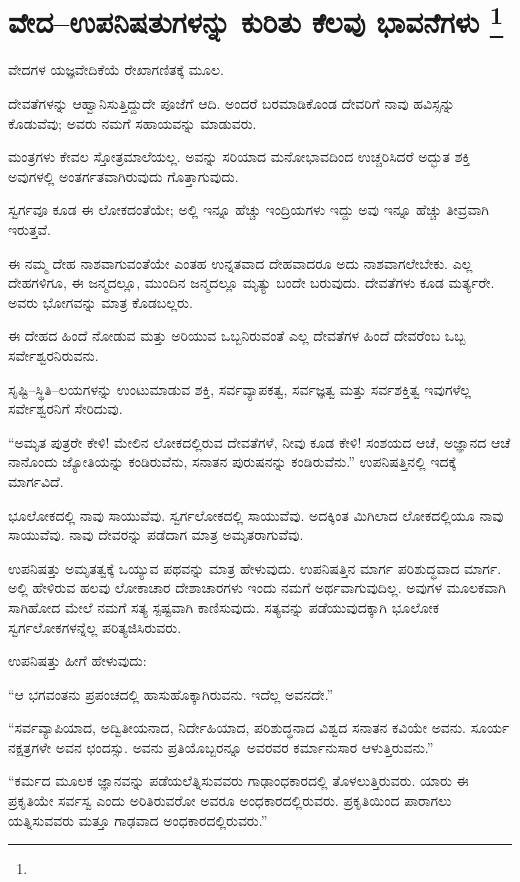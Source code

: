 
\chapter[ವೇದ–ಉಪನಿಷತುಗಳನ್ನು ಕುರಿತು ಕೆಲವು ಭಾವನೆಗಳು ]{ವೇದ–ಉಪನಿಷತುಗಳನ್ನು ಕುರಿತು ಕೆಲವು ಭಾವನೆಗಳು \protect\footnote{}}

ವೇದಗಳ ಯಜ್ಞವೇದಿಕೆಯೆ ರೇಖಾಗಣಿತಕ್ಕೆ  ಮೂಲ.

ದೇವತೆಗಳನ್ನು ಆಹ್ವಾನಿಸುತ್ತಿದ್ದುದೇ ಪೂಜೆಗೆ ಆದಿ. ಅಂದರೆ ಬರಮಾಡಿಕೊಂಡ ದೇವರಿಗೆ ನಾವು ಹವಿಸ್ಸನ್ನು ಕೊಡುವೆವು; ಅವರು ನಮಗೆ ಸಹಾಯವನ್ನು ಮಾಡುವರು.

ಮಂತ್ರಗಳು ಕೇವಲ ಸ್ತೋತ್ರಮಾಲೆಯಲ್ಲ. ಅವನ್ನು ಸರಿಯಾದ ಮನೋಭಾವದಿಂದ ಉಚ್ಚರಿಸಿದರೆ ಅದ್ಭುತ ಶಕ್ತಿ ಅವುಗಳಲ್ಲಿ ಅಂತರ್ಗತವಾಗಿರುವುದು ಗೊತ್ತಾಗುವುದು.

ಸ್ವರ್ಗವೂ ಕೂಡ ಈ ಲೋಕದಂತೆಯೇ; ಅಲ್ಲಿ ಇನ್ನೂ ಹೆಚ್ಚು ಇಂದ್ರಿಯಗಳು ಇದ್ದು ಅವು ಇನ್ನೂ ಹೆಚ್ಚು ತೀವ್ರವಾಗಿ ಇರುತ್ತವೆ.

ಈ ನಮ್ಮ ದೇಹ ನಾಶವಾಗುವಂತೆಯೇ ಎಂತಹ ಉನ್ನತವಾದ ದೇಹವಾದರೂ ಅದು ನಾಶವಾಗಲೇಬೇಕು. ಎಲ್ಲ ದೇಹಗಳಿಗೂ, ಈ ಜನ್ಮದಲ್ಲೂ, ಮುಂದಿನ ಜನ್ಮದಲ್ಲೂ ಮೃತ್ಯು ಬಂದೇ ಬರುವುದು. ದೇವತೆಗಳು ಕೂಡ ಮರ್ತ್ಯರೇ. ಅವರು ಭೋಗವನ್ನು ಮಾತ್ರ ಕೊಡಬಲ್ಲರು.

ಈ ದೇಹದ ಹಿಂದೆ ನೋಡುವ ಮತ್ತು ಅರಿಯುವ ಒಬ್ಬನಿರುವಂತೆ ಎಲ್ಲ ದೇವತೆಗಳ ಹಿಂದೆ ದೇವರೆಂಬ ಒಬ್ಬ ಸರ್ವೇಶ್ವರನಿರುವನು.

ಸೃಷ್ಟಿ–ಸ್ಥಿತಿ–ಲಯಗಳನ್ನು ಉಂಟುಮಾಡುವ ಶಕ್ತಿ, ಸರ್ವವ್ಯಾಪಕತ್ವ, ಸರ್ವಜ್ಞತ್ವ ಮತ್ತು ಸರ್ವಶಕ್ತಿತ್ವ ಇವುಗಳೆಲ್ಲ ಸರ್ವೇಶ್ವರನಿಗೆ ಸೇರಿದುವು.

“ಅಮೃತ ಪುತ್ರರೇ ಕೇಳಿ! ಮೇಲಿನ ಲೋಕದಲ್ಲಿರುವ ದೇವತೆಗಳೆ, ನೀವು ಕೂಡ ಕೇಳಿ! ಸಂಶಯದ ಆಚೆ, ಅಜ್ಞಾನದ ಆಚೆ ನಾನೊಂದು ಜ್ಯೋತಿಯನ್ನು ಕಂಡಿರುವೆನು, ಸನಾತನ ಪುರುಷನನ್ನು ಕಂಡಿರುವೆನು.” ಉಪನಿಷತ್ತಿನಲ್ಲಿ ಇದಕ್ಕೆ ಮಾರ್ಗವಿದೆ.

ಭೂಲೋಕದಲ್ಲಿ ನಾವು ಸಾಯುವೆವು. ಸ್ವರ್ಗಲೋಕದಲ್ಲಿ ಸಾಯುವೆವು. ಅದಕ್ಕಿಂತ ಮಿಗಿಲಾದ ಲೋಕದಲ್ಲಿಯೂ ನಾವು ಸಾಯುವೆವು. ನಾವು ದೇವರನ್ನು ಪಡೆದಾಗ ಮಾತ್ರ ಅಮೃತರಾಗುವೆವು.

ಉಪನಿಷತ್ತು ಅಮೃತತ್ವಕ್ಕೆ ಒಯ್ಯುವ ಪಥವನ್ನು ಮಾತ್ರ ಹೇಳುವುದು. ಉಪನಿಷತ್ತಿನ ಮಾರ್ಗ ಪರಿಶುದ್ಧವಾದ ಮಾರ್ಗ. ಅಲ್ಲಿ ಹೇಳಿರುವ ಹಲವು ಲೋಕಾಚಾರ ದೇಶಾಚಾರಗಳು ಇಂದು ನಮಗೆ ಅರ್ಥವಾಗುವುದಿಲ್ಲ. ಅವುಗಳ ಮೂಲಕವಾಗಿ ಸಾಗಿಹೋದ ಮೇಲೆ ನಮಗೆ ಸತ್ಯ ಸ್ಪಷ್ಟವಾಗಿ ಕಾಣಿಸುವುದು. ಸತ್ಯವನ್ನು ಪಡೆಯುವುದಕ್ಕಾಗಿ ಭೂಲೋಕ ಸ್ವರ್ಗಲೋಕಗಳನ್ನೆಲ್ಲ ಪರಿತ್ಯಜಿಸಿರುವರು.

ಉಪನಿಷತ್ತು ಹೀಗೆ ಹೇಳುವುದು:

“ಆ ಭಗವಂತನು ಪ್ರಪಂಚದಲ್ಲಿ ಹಾಸುಹೊಕ್ಕಾಗಿರುವನು. ಇದೆಲ್ಲ ಅವನದೇ.”

“ಸರ್ವವ್ಯಾಪಿಯಾದ, ಅದ್ವಿತೀಯನಾದ, ನಿರ್ದೇಹಿಯಾದ, ಪರಿಶುದ್ಧನಾದ ವಿಶ್ವದ ಸನಾತನ ಕವಿಯೇ ಅವನು. ಸೂರ್ಯ ನಕ್ಷತ್ರಗಳೇ ಅವನ ಛಂದಸ್ಸು. ಅವನು ಪ್ರತಿಯೊಬ್ಬರನ್ನೂ ಅವರವರ ಕರ್ಮಾನುಸಾರ ಆಳುತ್ತಿರುವನು.”

“ಕರ್ಮದ ಮೂಲಕ ಜ್ಞಾನವನ್ನು ಪಡೆಯಲೆತ್ನಿಸುವವರು ಗಾಢಾಂಧಕಾರದಲ್ಲಿ ತೊಳಲುತ್ತಿರುವರು. ಯಾರು ಈ ಪ್ರಕೃತಿಯೇ ಸರ್ವಸ್ವ ಎಂದು ಅರಿತಿರುವರೋ ಅವರೂ ಅಂಧಕಾರದಲ್ಲಿರುವರು. ಪ್ರಕೃತಿಯಿಂದ ಪಾರಾಗಲು ಯತ್ನಿಸುವವರು ಮತ್ತೂ ಗಾಢವಾದ ಅಂಧಕಾರದಲ್ಲಿರುವರು.”

